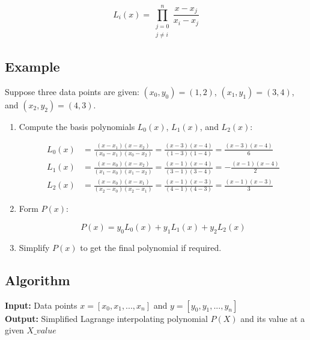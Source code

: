 \documentclass[a4paper,12pt]{article}
\begin{document}
	\begin{equation}
		L_i(x) = \prod_{\substack{j=0 \\ j \ne i}}^{n} \frac{x - x_j}{x_i - x_j}
		\label{eq:lagrange_basis}
	\end{equation}
	
	\subsection{Example}
	
	Suppose three data points are given: $(x_0, y_0) = (1, 2)$, $(x_1, y_1) = (3, 4)$, and $(x_2, y_2) = (4, 3)$.
	
	\begin{enumerate}
		\item Compute the basis polynomials $L_0(x)$, $L_1(x)$, and $L_2(x)$:
		
		\begin{align*}
			L_0(x) &= \frac{(x - x_1)(x - x_2)}{(x_0 - x_1)(x_0 - x_2)} = \frac{(x - 3)(x - 4)}{(1 - 3)(1 - 4)} = \frac{(x - 3)(x - 4)}{6} \\
			L_1(x) &= \frac{(x - x_0)(x - x_2)}{(x_1 - x_0)(x_1 - x_2)} = \frac{(x - 1)(x - 4)}{(3 - 1)(3 - 4)} = -\frac{(x - 1)(x - 4)}{2} \\
			L_2(x) &= \frac{(x - x_0)(x - x_1)}{(x_2 - x_0)(x_2 - x_1)} = \frac{(x - 1)(x - 3)}{(4 - 1)(4 - 3)} = \frac{(x - 1)(x - 3)}{3}
		\end{align*}
		
		\item Form $P(x)$:
		
		\begin{equation}
			P(x) = y_0 L_0(x) + y_1 L_1(x) + y_2 L_2(x)
		\end{equation}
		
		\item Simplify $P(x)$ to get the final polynomial if required.
	\end{enumerate}
	
	\subsection{Algorithm}
	
	\noindent \textbf{Input:} Data points $x = [x_0, x_1, ..., x_n]$ and $y = [y_0, y_1, ..., y_n]$ \\
	\textbf{Output:} Simplified Lagrange interpolating polynomial $P(X)$ and its value at a given $X\_value$
	
\end{document}
